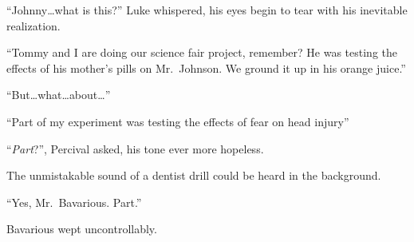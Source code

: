 ``Johnny{\ldots}what is this?'' Luke whispered, his eyes
begin to tear with his inevitable realization.

``Tommy and I are doing our science fair project, remember? He
was testing the effects of his mother's pills on Mr.\ Johnson.
We ground it up in his orange juice.''

``But{\ldots}what{\ldots}about{\ldots}''

``Part of my experiment was testing the effects of fear on
head injury''

``{\em Part}?'', Percival asked, his tone ever more
hopeless.

The unmistakable sound of a dentist drill could be heard in the
background.

``Yes, Mr.\ Bavarious. Part.''

Bavarious wept uncontrollably. 
 





